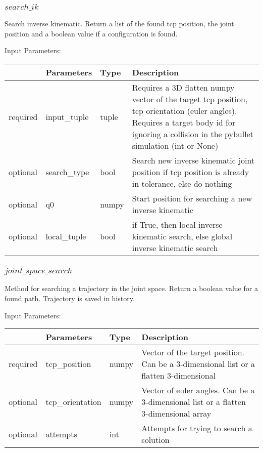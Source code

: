 \documentclass[
	ngerman,
	accentcolor=9c,%
	type=intern,
	marginpar=false
	]{tudapub}
\begin{document}
\subsubsection{$search\_ik$}
\noindent Search inverse kinematic. Return a list of the found tcp position, the joint position and a boolean value if a configuration is found. 

\vspace{0.5cm}
\noindent Input Parameters:
\vspace{0.5cm}

\begin{tabular}{|p{}|p{}|p{}| p{}|}
\hline
 & \textbf{Parameters} & \textbf{Type} & \textbf{Description} \\
\hline
required & input\_tuple & tuple & Requires a 3D flatten numpy vector of the target tcp position,  tcp orientation (euler angles). Requires a target body id for ignoring a collision in the pybullet simulation (int or None)\\
\hline
optional & search\_type & bool & Search new inverse kinematic joint position if tcp position is already in tolerance, else do nothing\\
\hline
optional & q0 & numpy & Start position for searching a new inverse kinematic\\
\hline
optional & local\_tuple & bool & if True, then local inverse kinematic search, else global inverse kinematic search\\
\hline
\end{tabular}
\vspace{1cm}



\subsubsection{$joint\_space\_search$}
\noindent Method for searching a trajectory in the joint space.  Return a boolean value for a found path. Trajectory is saved in history. 

\vspace{0.5cm}
\noindent Input Parameters:
\vspace{0.5cm}

\begin{tabular}{|p{}|p{}|p{}| p{}|}
\hline
 & \textbf{Parameters} & \textbf{Type} & \textbf{Description} \\
\hline
required & tcp\_position & numpy & Vector of the target position. Can be a 3-dimensional list or a flatten 3-dimensional\\
\hline
optional & tcp\_orientation & numpy & Vector of euler angles. Can be a 3-dimensional list or a flatten 3-dimensional array\\
\hline
optional & attempts & int & Attempts for trying to search a solution\\
\hline
\end{tabular}
\vspace{1cm}
\end{document}

